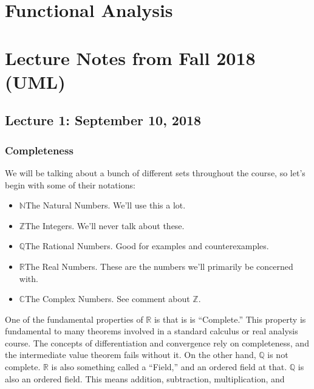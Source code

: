 \documentclass[crop=false,class=article,oneside]{standalone}
\begin{document}
    \ifx\ifmathcoursesfunctional\undefined
        \section*{Functional Analysis}
        \setcounter{section}{2}
    \else
        \section{Lecture Notes from Fall 2018 (UML)}
    \fi
    \subsection{Lecture 1: September 10, 2018}
        \subsubsection{Completeness}
            We will be talking about a bunch of different sets
            throughout the course, so let's begin with some of
            their notations:
            \begin{itemize}
                \item $\mathbb{N}$\quad The Natural Numbers.
                      We'll use this a lot.
                \item $\mathbb{Z}$\quad The Integers.
                      We'll never talk about these.
                \item $\mathbb{Q}$\quad The Rational Numbers.
                      Good for examples and counterexamples.
                \item $\mathbb{R}$\quad The Real Numbers.
                      These are the numbers we'll primarily
                      be concerned with.
                \item $\mathbb{C}$\quad The Complex Numbers.
                      See comment about $\mathbb{Z}$.
            \end{itemize}
            One of the fundamental properties of $\mathbb{R}$ is
            that is is ``Complete.'' This property is fundamental
            to many theorems involved in a standard calculus or
            real analysis course. The concepts of differentiation
            and convergence rely on completeness, and the
            intermediate value theorem fails without it. On the
            other hand, $\mathbb{Q}$ is not complete. $\mathbb{R}$
            is also something called a ``Field,'' and an ordered
            field at that. $\mathbb{Q}$ is also an ordered field.
            This means addition, subtraction, multiplication, and
\end{document}
